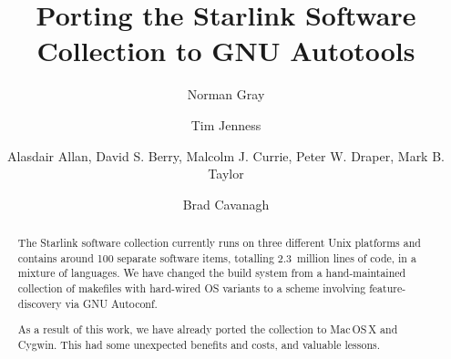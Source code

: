 \documentclass[11pt,twoside]{article}
\begin{document}

\title{Porting the Starlink Software Collection to GNU Autotools}
\marginpar{[v\RCSRevision]}

\author{Norman Gray}
\author{Tim Jenness}
\author{Alasdair Allan,
    David S. Berry,
    Malcolm J. Currie,
    Peter W. Draper,
    Mark B. Taylor}
\author{Brad Cavanagh}







\begin{abstract}
The Starlink software collection currently runs on three different
Unix platforms and contains around 100 separate software items,
totalling 2.3~million lines of code, in a mixture of languages.  We
have changed the build system from a hand-maintained collection of
makefiles with hard-wired OS variants to a scheme involving
feature-discovery via GNU Autoconf.

As a result of this work, we have already ported the collection to
Mac\,OS\,X and Cygwin.  This had some unexpected benefits and costs, and
valuable lessons.
\end{abstract}
\end{document}
